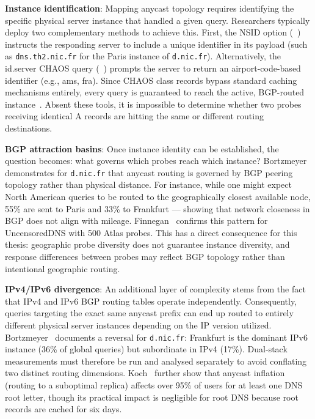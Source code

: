 \textbf{Instance identification}: Mapping anycast topology requires identifying the specific physical server instance that handled a given query. Researchers typically deploy two complementary methods to achieve this. First, the \ac{NSID} option (~\cite{RFC5001}) instructs the responding server to include a unique identifier in its payload (such as \texttt{dns.th2.nic.fr} for the Paris instance of \texttt{d.nic.fr}). Alternatively, the id.server CHAOS query (~\cite{RFC4892}) prompts the server to return an airport-code-based identifier (e.g., ams, fra). Since CHAOS class records bypass standard caching mechanisms entirely, every query is guaranteed to reach the active, \ac{BGP}-routed instance~\cite{Finnegan2018}. Absent these tools, it is impossible to determine whether two probes receiving identical \ac{A} records are hitting the same or different routing destinations.

\textbf{\ac{BGP} attraction basins}: Once instance identity can be established, the question becomes: what governs which probes reach which instance? Bortzmeyer~\cite{Bortzmeyer2013} demonstrates for \texttt{d.nic.fr} that anycast routing is governed by \ac{BGP} peering topology rather than physical distance. For instance, while one might expect North American queries to be routed to the geographically closest available node, 55\% are sent to Paris and 33\% to Frankfurt — showing that network closeness in \ac{BGP} does not align with mileage. Finnegan~\cite{Finnegan2018} confirms this pattern for UncensoredDNS with 500 Atlas probes. This has a direct consequence for this thesis: geographic probe diversity does not guarantee instance diversity, and response differences between probes may reflect \ac{BGP} topology rather than intentional geographic routing.

\textbf{\ac{IPv4}/\ac{IPv6} divergence}: An additional layer of complexity stems from the fact that \ac{IPv4} and \ac{IPv6} \ac{BGP} routing tables operate independently. Consequently, queries targeting the exact same anycast prefix can end up routed to entirely different physical server instances depending on the \ac{IP} version utilized.
Bortzmeyer~\cite{Bortzmeyer2013} documents a reversal for \texttt{d.nic.fr}: Frankfurt is the dominant \ac{IPv6} instance (36\% of global queries) but subordinate in \ac{IPv4} (17\%). Dual-stack measurements must therefore be run and analysed separately to avoid conflating two distinct routing dimensions. Koch~\cite{Koch2021} further show that anycast inflation (routing to a suboptimal replica) affects over 95\% of users for at least one \ac{DNS} root letter, though its practical impact is negligible for root \ac{DNS} because root records are cached for six days.

